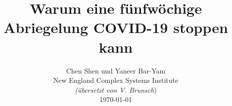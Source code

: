 \documentclass[onecolumn,journal]{IEEEtran}
\begin{document}
\title{\color{Brown} Warum eine fünfwöchige Abriegelung COVID-19 stoppen kann \\
\vspace{-0.35ex}}
\author{Chen Shen und Yaneer Bar-Yam \\ New England Complex Systems Institute \\
\vspace{+0.35ex}
\small{\textit{(übersetzt von V. Brunsch})}\\
 \today
  \vspace{-14ex} \\


\bigskip
\bigskip

\textbf{}
 }

\maketitle


\flushbottom %



\thispagestyle{empty} %




\renewcommand{\thefootnote}{\fnsymbol{footnote}}
\end{document}
